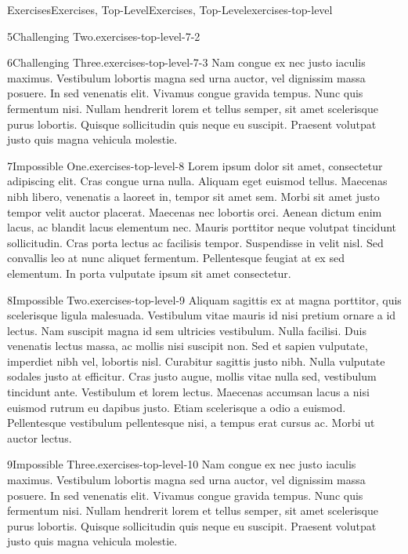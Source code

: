 \documentclass[twoside,10pt,]{article}
\numberwithin{equation}{section}
\begin{document}
\begin{exercises-section}{Exercises}{Exercises, Top-Level}{}{Exercises, Top-Level}{}{}{exercises-top-level}
\begin{exercisegroup}
\begin{divisionexerciseeg}{5}{Challenging Two.}{}{exercises-top-level-7-2}
\end{divisionexerciseeg}%
\begin{divisionexerciseeg}{6}{Challenging Three.}{}{exercises-top-level-7-3}%
Nam congue ex nec justo iaculis maximus. Vestibulum lobortis magna sed urna auctor, vel dignissim massa posuere. In sed venenatis elit. Vivamus congue gravida tempus. Nunc quis fermentum nisi. Nullam hendrerit lorem et tellus semper, sit amet scelerisque purus lobortis. Quisque sollicitudin quis neque eu suscipit. Praesent volutpat justo quis magna vehicula molestie.%
\end{divisionexerciseeg}%
\end{exercisegroup}
\par\medskip\noindent
\begin{divisionexercise}{7}{Impossible One.}{}{exercises-top-level-8}%
Lorem ipsum dolor sit amet, consectetur adipiscing elit. Cras congue urna nulla. Aliquam eget euismod tellus. Maecenas nibh libero, venenatis a laoreet in, tempor sit amet sem. Morbi sit amet justo tempor velit auctor placerat. Maecenas nec lobortis orci. Aenean dictum enim lacus, ac blandit lacus elementum nec. Mauris porttitor neque volutpat tincidunt sollicitudin. Cras porta lectus ac facilisis tempor. Suspendisse in velit nisl. Sed convallis leo at nunc aliquet fermentum. Pellentesque feugiat at ex sed elementum. In porta vulputate ipsum sit amet consectetur.%
\end{divisionexercise}%
\begin{divisionexercise}{8}{Impossible Two.}{}{exercises-top-level-9}%
Aliquam sagittis ex at magna porttitor, quis scelerisque ligula malesuada. Vestibulum vitae mauris id nisi pretium ornare a id lectus. Nam suscipit magna id sem ultricies vestibulum. Nulla facilisi. Duis venenatis lectus massa, ac mollis nisi suscipit non. Sed et sapien vulputate, imperdiet nibh vel, lobortis nisl. Curabitur sagittis justo nibh. Nulla vulputate sodales justo at efficitur. Cras justo augue, mollis vitae nulla sed, vestibulum tincidunt ante. Vestibulum et lorem lectus. Maecenas accumsan lacus a nisi euismod rutrum eu dapibus justo. Etiam scelerisque a odio a euismod. Pellentesque vestibulum pellentesque nisi, a tempus erat cursus ac. Morbi ut auctor lectus.%
\end{divisionexercise}%
\begin{divisionexercise}{9}{Impossible Three.}{}{exercises-top-level-10}%
Nam congue ex nec justo iaculis maximus. Vestibulum lobortis magna sed urna auctor, vel dignissim massa posuere. In sed venenatis elit. Vivamus congue gravida tempus. Nunc quis fermentum nisi. Nullam hendrerit lorem et tellus semper, sit amet scelerisque purus lobortis. Quisque sollicitudin quis neque eu suscipit. Praesent volutpat justo quis magna vehicula molestie.%

\end{divisionexercise}
\end{exercises-section}
\end{document}
